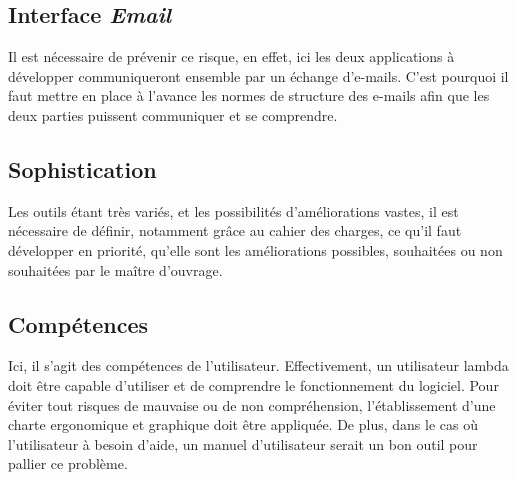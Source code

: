 \documentclass[etudiants]{support-iutrs}
\begin{document}
\subsection{Interface \emph{Email}}

Il est nécessaire de prévenir ce risque, en effet, ici les deux applications à développer communiqueront ensemble par un échange d'e-mails. C'est pourquoi il faut mettre en place à l'avance les normes de structure des e-mails afin que les deux parties  puissent communiquer et se comprendre.

\subsection{Sophistication}

Les outils étant très variés, et les possibilités d'améliorations vastes, il est nécessaire de définir, notamment grâce au cahier des charges, ce qu'il faut développer en priorité, qu'elle sont les améliorations possibles, souhaitées ou non souhaitées par le maître d'ouvrage.

\subsection{Compétences}

Ici, il s'agit des compétences de l'utilisateur. Effectivement, un utilisateur lambda doit être capable d'utiliser et de comprendre le fonctionnement du logiciel. Pour éviter tout risques de mauvaise ou de non compréhension, l'établissement d'une charte ergonomique et graphique doit être appliquée. De plus, dans le cas où l'utilisateur à besoin d'aide, un manuel d'utilisateur serait un bon outil pour pallier ce problème.

\subsection{} 
\end{document}
